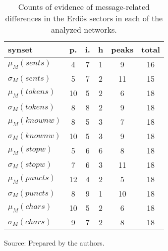 \begin{table}[h!]
\begin{center}
\caption{Counts of evidence of message-related differences in the Erd\"os sectors in each of the analyzed networks.}
	\def\arraystretch{1.5}
\begin{tabular}{| l || c | c | c || c | c |}\hline
{\bf synset} & {\bf p.} & {\bf i.} & {\bf h} & {\bf peaks} & {\bf total} \\\hline\hline
$\mu_M(sents)$ & 4  & 7  & 1  & 9  & 16 \\
$\sigma_M(sents)$ & 5  & 7  & 2  & 11  & 15 \\\hline
$\mu_M(tokens)$ & 10  & 5  & 2  & 6  & 18 \\
$\sigma_M(tokens)$ & 8  & 8  & 2  & 9  & 18 \\\hline
$\mu_M(knownw)$ & 8  & 5  & 3  & 7  & 18 \\
$\sigma_M(knownw)$ & 10  & 5  & 3  & 9  & 18 \\\hline
$\mu_M(stopw)$ & 5  & 6  & 6  & 8  & 18 \\
$\sigma_M(stopw)$ & 7  & 6  & 3  & 11  & 18 \\\hline
$\mu_M(puncts)$ & 12  & 4  & 2  & 5  & 18 \\
$\sigma_M(puncts)$ & 8  & 9  & 1  & 10  & 18 \\\hline
$\mu_M(chars)$ & 10  & 5  & 2  & 6  & 18 \\
$\sigma_M(chars)$ & 9  & 7  & 2  & 8  & 18 \\\hline
\end{tabular}
\begin{flushleft}
		Source: Prepared by the authors.\
\end{flushleft}
\end{center}
\end{table}
